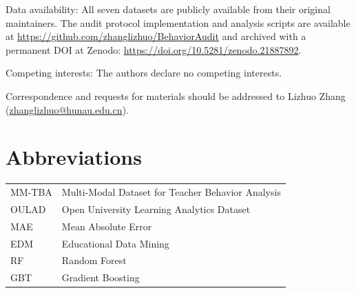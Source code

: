 \documentclass[10pt,letterpaper]{wlscirep}
\begin{document}
Data availability: All seven datasets are publicly available from their original
maintainers. The audit protocol implementation and analysis scripts are available at
\url{https://github.com/zhanglizhuo/BehaviorAudit} and archived with a permanent
DOI at Zenodo: \url{https://doi.org/10.5281/zenodo.21887892}.

Competing interests: The authors declare no competing interests.

Correspondence and requests for materials should be addressed to Lizhuo Zhang
(\url{zhanglizhuo@hunau.edu.cn}).

\section*{Abbreviations}
\noindent
\begin{tabular}{@{}ll}
MM-TBA & Multi-Modal Dataset for Teacher Behavior Analysis \\
OULAD  & Open University Learning Analytics Dataset \\
MAE    & Mean Absolute Error \\
EDM    & Educational Data Mining \\
RF     & Random Forest \\
GBT    & Gradient Boosting \\
\end{tabular}


\end{document}
